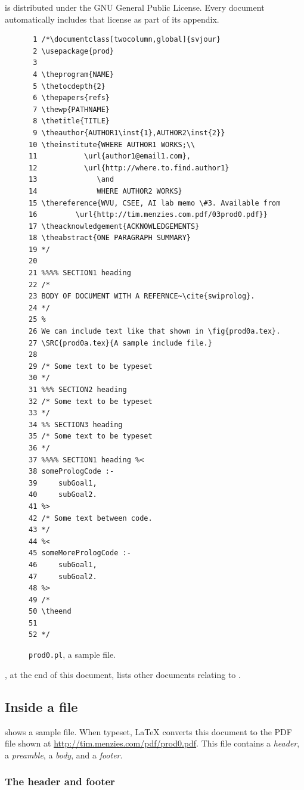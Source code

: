 {\PROD} is distributed under the GNU General Public License. Every
{\PROD} document automatically includes that license as part of
its appendix.

\begin{figure}
{\scriptsize \begin{verbatim}
 1 /*\documentclass[twocolumn,global]{svjour}
 2 \usepackage{prod}
 3
 4 \theprogram{NAME}
 5 \thetocdepth{2}
 6 \thepapers{refs}
 7 \thewp{PATHNAME}
 8 \thetitle{TITLE}
 9 \theauthor{AUTHOR1\inst{1},AUTHOR2\inst{2}}
10 \theinstitute{WHERE AUTHOR1 WORKS;\\
11           \url{author1@email1.com},
12           \url{http://where.to.find.author1}
13              \and
14              WHERE AUTHOR2 WORKS}
15 \thereference{WVU, CSEE, AI lab memo \#3. Available from
16         \url{http://tim.menzies.com.pdf/03prod0.pdf}}
17 \theacknowledgement{ACKNOWLEDGEMENTS}
18 \theabstract{ONE PARAGRAPH SUMMARY}
19 */
20
21 %%%% SECTION1 heading
22 /*
23 BODY OF DOCUMENT WITH A REFERNCE~\cite{swiprolog}.
24 */
25 %
26 We can include text like that shown in \fig{prod0a.tex}.
27 \SRC{prod0a.tex}{A sample include file.}
28
29 /* Some text to be typeset
30 */
31 %%% SECTION2 heading
32 /* Some text to be typeset
33 */
34 %% SECTION3 heading
35 /* Some text to be typeset
36 */
37 %%%% SECTION1 heading %<
38 somePrologCode :-
39     subGoal1,
40     subGoal2.
41 %>
42 /* Some text between code.
43 */
44 %<
45 someMorePrologCode :-
46     subGoal1,
47     subGoal2.
48 %>
49 /*
50 \theend
51 
52 */
\end{verbatim}}
\caption[{\tt prod0.pl}]{{\tt prod0.pl}, a sample {\PROD}
file.}\label{fig:prod0sample}
\end{figure}

, at the end of this document, lists other
documents relating to {\PROD}.

\subsection{Inside a {\PROD} file}

 shows a sample {\PROD} file. When typeset,
{\LaTeX} converts this document to the PDF file shown at
\url{http://tim.menzies.com/pdf/prod0.pdf}. This file contains a
{\em header}, a {\em preamble}, a {\em body}, and a {\em footer}.

\subsubsection{The header and footer}

